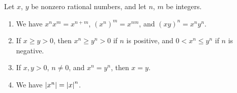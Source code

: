 \begin{proposition}\label{4.3.12}
    Let \(x\), \(y\) be nonzero rational numbers, and let \(n\), \(m\) be integers.
    \begin{enumerate}
        \item We have \(x^n x^m = x^{n + m}\), \((x^n)^m = x^{nm}\), and \((xy)^n = x^n y^n\).
        \item If \(x \geq y > 0\), then \(x^n \geq y^n > 0\) if \(n\) is positive, and \(0 < x^n \leq y^n\) if \(n\) is negative.
        \item If \(x, y > 0\), \(n \neq 0\), and \(x^n = y^n\), then \(x = y\).
        \item We have \(\abs*{x^n} = \abs*{x}^n\).
    \end{enumerate}
\end{proposition}

